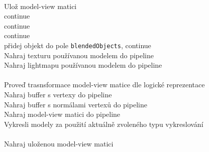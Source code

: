 \pagebreak
\begin{algorithmic}
\label{algorithm:vykreslovani}
 \\ 
Ulož model-view matici
 \\ \quad \quad continue \EndIf
{} \\ \quad \quad continue \EndIf
		 \\ \quad \quad \quad \quad continue \EndIf
		 \\ \quad \quad \quad \quad přidej objekt do pole \texttt{blendedObjects}, continue\EndIf
		 \\ \quad \quad \quad \quad Nahraj texturu používanou modelem do pipeline \EndIf
		 \\ \quad \quad \quad \quad Nahraj lightmapu používanou modelem do pipeline  \EndIf	\\
    	 \\ \quad \quad \quad \quad Proveď trasnsformace model-view matice dle logické reprezentace \EndIf	\\
	    \quad \quad \quad Nahraj buffer s vertexy do pipeline \\
		\quad \quad \quad Nahraj buffer s normálami vertexů do pipeline \\ 
		\quad \quad \quad Nahraj model-view matici do pipeline \\ 
		\quad \quad \quad Vykresli modely za použití aktuálně zvoleného typu vykreslování \\
	\EndFor \\
Nahraj uloženou model-view matici
\EndFor
\end{algorithmic} 
\medskip

